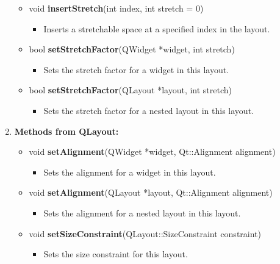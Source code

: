 \documentclass{report}
\begin{document}
\begin{enumerate}[label=\textbf{\arabic*.}]
\begin{itemize}
        \item void \textbf{insertStretch}(int index, int stretch = 0)
        \begin{itemize}
            \item Inserts a stretchable space at a specified index in the layout.
        \end{itemize}
        
        \item bool \textbf{setStretchFactor}(QWidget *widget, int stretch)
        \begin{itemize}
            \item Sets the stretch factor for a widget in this layout.
        \end{itemize}
        
        \item bool \textbf{setStretchFactor}(QLayout *layout, int stretch)
        \begin{itemize}
            \item Sets the stretch factor for a nested layout in this layout.
        \end{itemize}
    \end{itemize}

    \item \textbf{Methods from QLayout:}
    \begin{itemize}
        \item void \textbf{setAlignment}(QWidget *widget, Qt::Alignment alignment)
        \begin{itemize}
            \item Sets the alignment for a widget in this layout.
        \end{itemize}
        
        \item void \textbf{setAlignment}(QLayout *layout, Qt::Alignment alignment)
        \begin{itemize}
            \item Sets the alignment for a nested layout in this layout.
        \end{itemize}
        
        \item void \textbf{setSizeConstraint}(QLayout::SizeConstraint constraint)
        \begin{itemize}
            \item Sets the size constraint for this layout.
        \end{itemize}
        

\end{itemize}
\end{enumerate}
\end{document}
